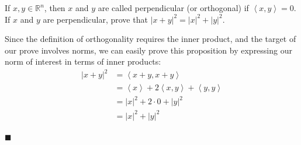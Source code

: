 \documentclass[12pt]{article}
\renewcommand{\qed}{\hfill$\blacksquare$}
\renewenvironment{proof}{\begin{addmargin}[1em]{0em}\begin{newproof}}{\end{newproof}\end{addmargin}\qed}
\newenvironment{problem}[2][Problem]{\begin{trivlist}
\item[\hskip \labelsep {\bfseries #1}\hskip \labelsep {\bfseries #2.}]}{\end{trivlist}}
\begin{document}
 
 \begin{problem}{1-13}
 If $x,y\in \mathbb{R}^n$, then $x$ and $y$ are called perpendicular (or orthogonal) if $\left\langle x, y\right\rangle = 0$. If $x$ and $y$ are perpendicular, prove that $\left|x+y\right|^2 = \left|x\right|^2 + \left|y\right|^2$.
\end{problem} 
\begin{proof}
Since the definition of orthogonality requires the inner product, and the target of our prove involves norms, we can easily prove this proposition by expressing our norm of interest in terms of inner products:
\begin{equation*}
\begin{split}
\left| x+y\right|^2 & = \left\langle x+y, x+y \right\rangle \\
& = \left\langle x \right\rangle + 2\left\langle x,y \right\rangle + \left\langle y ,y \right\rangle \\ 
& = \left|x\right|^2 + 2\cdot 0 + \left|y\right|^2 \\
& = \left|x\right|^2 + \left| y \right|^2\\
\end{split}
\end{equation*}
\end{proof}
 
 
 
\end{document}
